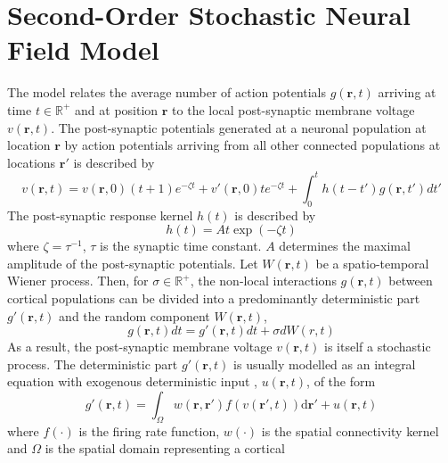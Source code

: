 \documentclass[a4paper,10pt]{article}
\begin{document}
\section{Second-Order Stochastic Neural Field Model}
The model relates the average number of action potentials $g(\mathbf{r},t)$
arriving at time $t \in \mathbb R^{+}$ and at position $\mathbf{r}$ to the local
post-synaptic membrane voltage $v(\mathbf{r},t)$. The post-synaptic potentials
generated at a neuronal population at location $\mathbf{r}$ by action potentials
arriving from all other connected populations at locations $\mathbf{r}'$ is
described by 
\begin{equation}
	\label{eq:SecondOrderSpikesToPotential} v\left( {\mathbf{r},t}
\right)=v(\mathbf r, 0)(t+1)e^{-\zeta t}+v'(\mathbf r,0)te^{-\zeta t}+\int_0^t
{h\left( {t - t'} \right)g\left( {\mathbf{r},t'} \right)dt'} 
\end{equation}
The post-synaptic response kernel $h(t)$ is described by 
\begin{equation}
	\label{eq:SecondOrderSynapticRespKernel} h(t) = At\exp{\left(-\zeta
t\right)} 
\end{equation}
where $\zeta=\tau^{-1}$, $\tau$ is the synaptic time constant.  $A$ determines
the maximal amplitude of the post-synaptic potentials.
Let $W(\mathbf r,t)$ be a spatio-temporal Wiener process. Then, for $\sigma \in
\mathbb R^{+}$, the non-local interactions $g\left( {\mathbf{r},t} \right)$
between cortical populations can be divided into a predominantly deterministic
part $g'\left( {\mathbf{r},t} \right) $ and  the random component $W(\mathbf
r,t)$,
\begin{equation}\label{eq:SecondOrderActPotComponents}
  g\left( {\mathbf{r},t} \right)dt=g'\left( {\mathbf{r},t} \right)dt+\sigma d
W(r,t)
\end{equation}
As a result, the post-synaptic membrane voltage $v(\mathbf r, t)$ is itself a
stochastic process. The deterministic part $g'(\mathbf r, t)$ is usually
modelled as an integral equation with exogenous deterministic input , $
u(\mathbf r,t)$, of the form \cite{Atay2005}
\begin{equation}
	\label{DeterministicRateBasedInteractions} g'\left( \mathbf{r},t \right)
= \int_\Omega {w\left( \mathbf{r},\mathbf{r}' \right)f\left( v\left(
\mathbf{r}',t \right) \right)\textrm{d}\mathbf{r}'}+u(\mathbf r,t)
\end{equation}
where $f(\cdot)$ is the firing rate function, $w(\cdot)$ is the spatial
connectivity kernel and $\Omega$ is the spatial domain representing a cortical
\end{document}
